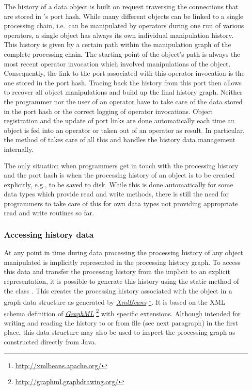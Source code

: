 The history of a data object is built on
request traversing the connections that are stored in \alida's port hash. While
many different objects can be linked to a single processing chain, i.e.~can be
manipulated by operators during one run of various operators, a single object
has always its own individual manipulation history. This history is given by a
certain path within the manipulation graph of the complete processing chain. 
The starting point of the object's path is always the most recent operator
invocation which involved manipulations of the object. Consequently, the link to
the port associated with this operator invocation is the one stored in the port hash.
Tracing back the history from this port then allows to recover all object
manipulations and build up the final history graph. Neither the programmer nor
the user of an operator have to take care of the data stored in the port hash or
the correct logging of operator invocations. Object registration and the update of
port links are done automatically each time an object is fed into an operator or
taken out of an operator as result. In particular, the  method of
 takes care of all this and handles the history data management
internally. 

The only situation when programmers get in touch with the processing history and the port
hash is when the processing history of an object is to be created explicitly,
e.g., to be saved to disk. While this
is done automatically for some \alida data types which provide read and write
methods, there is still the need for programmers to take care of
this for own data types not providing appropriate read and write routines so far.

\subsubsection{Accessing history data}
At any point in time during data processing the processing history of
any object manipulated is implicitly represented in the processing history graph. 
To access this data and transfer the processing
history from the implicit to an explicit representation, it is possible to 
generate this history using the static method
 of the class .
This creates the processing history associated with the object
in a graph data structure as generated by
\href{http://xmlbeans.apache.org/}{\em XmlBeans}
\footnote{\url{http://xmlbeans.apache.org/}}. It is based on the XML schema definition of
\href{http://graphml.graphdrawing.org/}{\em GraphML}
\footnote{\url{http://graphml.graphdrawing.org/}} with \alida
specific extensions. Although intended for writing and reading the history to or from file (see next paragraph) in the first place, this data structure may also be used to inspect the processing graph as constructed directly from Java.

